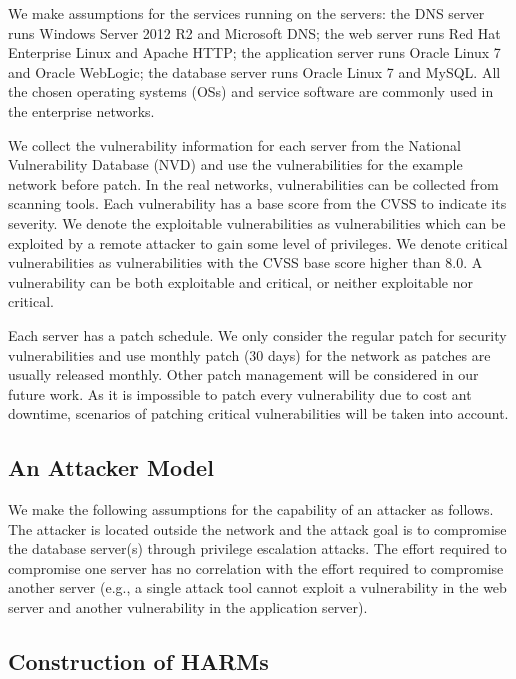 \documentclass[conference]{IEEEtran}
\begin{document}
We make assumptions for the services running on the servers: the DNS server runs Windows Server 2012 R2 and Microsoft DNS; the web server runs Red Hat Enterprise Linux and Apache HTTP; the application server runs Oracle Linux 7 and Oracle WebLogic; the database server runs Oracle Linux 7 and MySQL. All the chosen operating systems (OSs) and service software are commonly used in the enterprise networks.

We collect the vulnerability information for each server from the National Vulnerability Database (NVD) and use the vulnerabilities for the example network before patch. In the real networks, vulnerabilities can be collected from scanning tools. Each vulnerability has a base score from the CVSS to indicate its severity. We denote the exploitable vulnerabilities as vulnerabilities which can be exploited by a remote attacker to gain some level of privileges. We denote critical vulnerabilities as vulnerabilities with the CVSS base score higher than 8.0. A vulnerability can be both exploitable and critical, or neither exploitable nor critical.

Each server has a patch schedule. We only consider the regular patch for security vulnerabilities and use monthly patch (30 days) for the network as patches are usually released monthly. Other patch management will be considered in our future work. As it is impossible to patch every vulnerability due to cost ant downtime, scenarios of patching critical vulnerabilities will be taken into account. 

\subsection{An Attacker Model}
\label{attack}

We make the following assumptions for the capability of an attacker as follows. The attacker is located outside the network and the attack goal is to compromise the database server(s) through privilege escalation attacks. The effort required to compromise one server has no correlation with the effort required to compromise another server (e.g., a single attack tool cannot exploit a vulnerability in the web server and another vulnerability in the application server).

\subsection{Construction of HARMs}
\label{sec}
\end{document}
